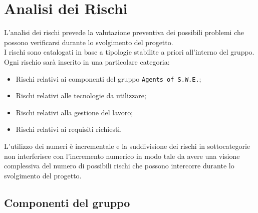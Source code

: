 \section{Analisi dei Rischi}

L'analisi dei rischi prevede la valutazione preventiva dei possibili problemi che possono verificarsi durante lo svolgimento del progetto. \\
I rischi sono catalogati in base a tipologie stabilite a priori all'interno del gruppo. 
Ogni rischio sarà inserito in una particolare categoria:
\begin{itemize}
\item Rischi relativi ai componenti del gruppo \texttt{Agents of S.W.E.};
\item Rischi relativi alle tecnologie da utilizzare;
\item Rischi relativi alla gestione del lavoro;
\item Rischi relativi ai requisiti richiesti.  
\end{itemize}

L'utilizzo dei numeri è incrementale e la suddivisione dei rischi in sottocategorie non interferisce con l'incremento numerico in modo tale da avere una visione complessiva del numero di possibili rischi che possono intercorre durante lo svolgimento del progetto.

\subsection{Componenti del gruppo}

